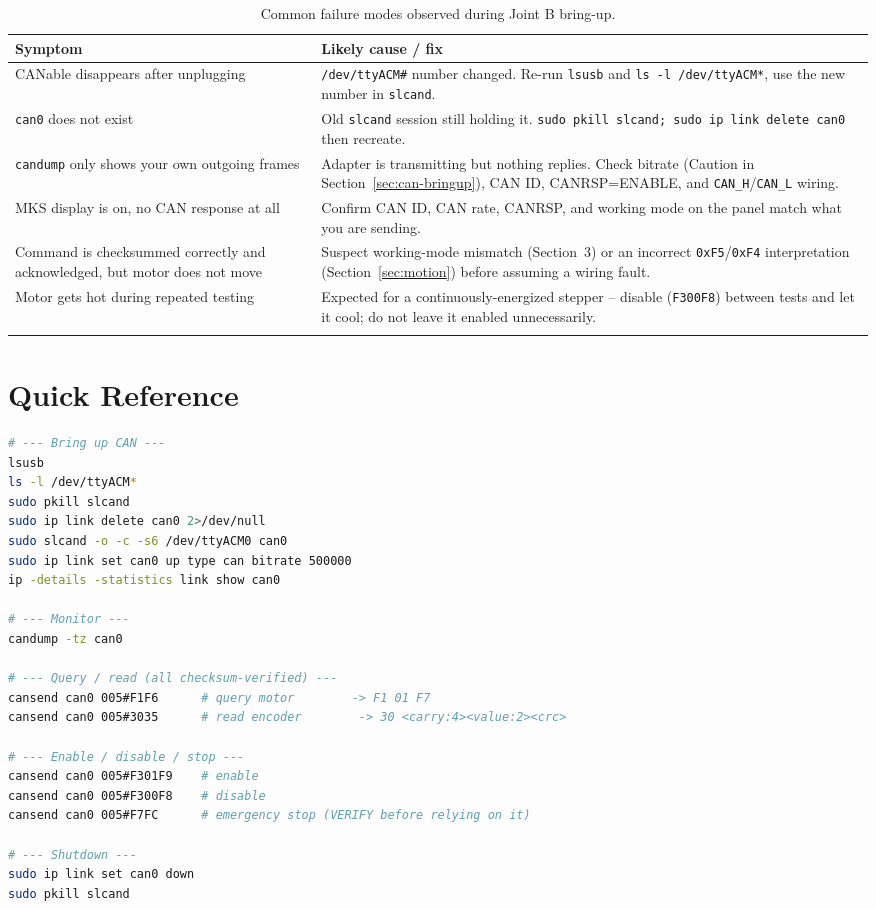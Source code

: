 \documentclass[11pt,letterpaper]{article}
\begin{document}
\begin{longtable}{p{}p{}}
\toprule
\textbf{Symptom} & \textbf{Likely cause / fix} \\ \midrule
\endhead
CANable disappears after unplugging & \texttt{/dev/ttyACM\#} number changed. Re-run \texttt{lsusb} and \texttt{ls -l /dev/ttyACM*}, use the new number in \texttt{slcand}. \\
\texttt{can0} does not exist & Old \texttt{slcand} session still holding it. \texttt{sudo pkill slcand; sudo ip link delete can0} then recreate. \\
\texttt{candump} only shows your own outgoing frames & Adapter is transmitting but nothing replies. Check bitrate (Caution in Section~\ref{sec:can-bringup}), CAN ID, CANRSP=ENABLE, and \texttt{CAN\_H}/\texttt{CAN\_L} wiring. \\
MKS display is on, no CAN response at all & Confirm CAN ID, CAN rate, CANRSP, and working mode on the panel match what you are sending. \\
Command is checksummed correctly and acknowledged, but motor does not move & Suspect working-mode mismatch (Section~3) or an incorrect \texttt{0xF5}/\texttt{0xF4} interpretation (Section~\ref{sec:motion}) before assuming a wiring fault. \\
Motor gets hot during repeated testing & Expected for a continuously-energized stepper -- disable (\texttt{F300F8}) between tests and let it cool; do not leave it enabled unnecessarily. \\
\bottomrule
\caption{Common failure modes observed during Joint B bring-up.}
\end{longtable}

\newpage
\section{Quick Reference}

\begin{lstlisting}[language=bash, caption=Copy/paste reference for a normal session]
# --- Bring up CAN ---
lsusb
ls -l /dev/ttyACM*
sudo pkill slcand
sudo ip link delete can0 2>/dev/null
sudo slcand -o -c -s6 /dev/ttyACM0 can0
sudo ip link set can0 up type can bitrate 500000
ip -details -statistics link show can0

# --- Monitor ---
candump -tz can0

# --- Query / read (all checksum-verified) ---
cansend can0 005#F1F6      # query motor        -> F1 01 F7
cansend can0 005#3035      # read encoder        -> 30 <carry:4><value:2><crc>

# --- Enable / disable / stop ---
cansend can0 005#F301F9    # enable
cansend can0 005#F300F8    # disable
cansend can0 005#F7FC      # emergency stop (VERIFY before relying on it)

# --- Shutdown ---
sudo ip link set can0 down
sudo pkill slcand
\end{lstlisting}
\end{document}
